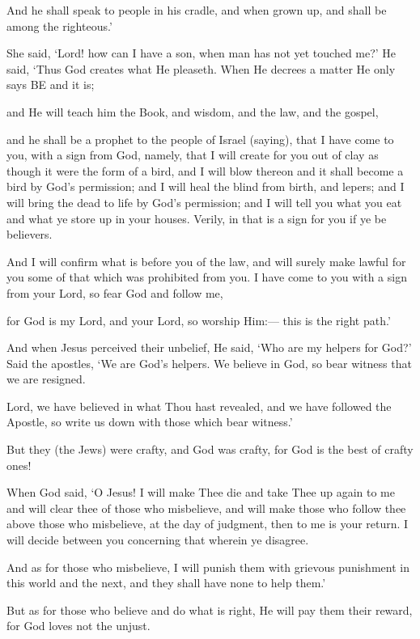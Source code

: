 \documentclass[fontsize=14pt, letterpaper, notitlepage, openany, DIV=12]{scrbook} %
\begin{document}
\noindent[3:46]
And he shall speak to people in his cradle, and when grown up, and shall be among the
righteous.'

\noindent[3:47]
She said, `Lord! how can I have a son, when man has not yet touched me?' He said,
`Thus God creates what He pleaseth. When He decrees a matter He only says BE and it is;

\noindent[3:48]
and He will teach him the Book, and wisdom, and the law, and the gospel,

\noindent[3:49]
and he shall be a prophet to the people of Israel (saying), that I have come to you, with a
sign from God, namely, that I will create for you out of clay as though it were the form of a bird,
and I will blow thereon and it shall become a bird by God's permission; and I will heal the blind
from birth, and lepers; and I will bring the dead to life by God's permission; and I will tell you
what you eat and what ye store up in your houses. Verily, in that is a sign for you if ye be
believers.

\noindent[3:50]
And I will confirm what is before you of the law, and will surely make lawful for you
some of that which was prohibited from you. I have come to you with a sign from your Lord, so
fear God and follow me,

\noindent[3:51]
for God is my Lord, and your Lord, so worship Him:--- this is the right path.'

\noindent[3:52]
And when Jesus perceived their unbelief, He said, `Who are my helpers for God?' Said
the apostles, `We are God's helpers. We believe in God, so bear witness that we are resigned.

\noindent[3:53]
Lord, we have believed in what Thou hast revealed, and we have followed the Apostle, so
write us down with those which bear witness.'

\noindent[3:54]
But they (the Jews) were crafty, and God was crafty, for God is the best of crafty ones!

\noindent[3:55]
When God said, `O Jesus! I will make Thee die and take Thee up again to me and will
clear thee of those who misbelieve, and will make those who follow thee above those who
misbelieve, at the day of judgment, then to me is your return. I will decide between you
concerning that wherein ye disagree.

\noindent[3:56]
And as for those who misbelieve, I will punish them with grievous punishment in this
world and the next, and they shall have none to help them.'

\noindent[3:57]
But as for those who believe and do what is right, He will pay them their reward, for God
loves not the unjust.
\end{document}
